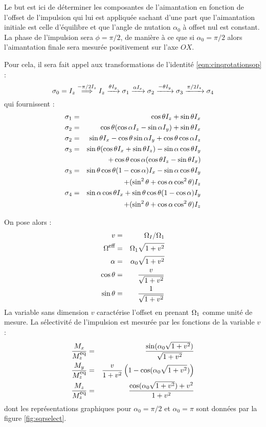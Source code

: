 Le but est ici de déterminer les composantes de l'aimantation
en fonction de l'offset de l'impulsion qui lui est appliquée
sachant d'une part que l'aimantation initiale est celle d'équilibre
et que l'angle de nutation $\alpha_0$ à offset nul est constant.
La phase de l'impulsion sera $\phi = \pi/2$, de manière à ce que si $\alpha_0 = \pi/2$
alors l'aimantation finale sera mesurée positivement sur l'axe $OX$.

Pour cela, il sera fait appel aux transformations de 
l'identité \ref{eqn:cinqrotationsop} :
\begin{equation}
\sigma_0 = I_z
\stackrel{-\pi/2 I_z}{\Longrightarrow} I_z
\xrightarrow{\theta I_y} \sigma_1
\xrightarrow{\alpha I_x} \sigma_2
\xrightarrow{-\theta I_y} \sigma_3
\xrightarrow{\pi/2 I_z} \sigma_4
\end{equation}
qui fournissent :
\begin{eqnarray}
\sigma_1 & = & \cos\theta I_z + \sin\theta I_x \\
\sigma_2 & = & \cos\theta(\cos\alpha I_z - \sin\alpha I_y) + \sin\theta I_x \\
\sigma_2 & = & \sin\theta I_x - \cos\theta\sin\alpha I_y + \cos\theta\cos\alpha I_z \\
\sigma_3 & = & \sin\theta(\cos\theta I_x + \sin\theta I_z) - \sin\alpha\cos\theta I_y \nonumber\\
& & \quad + \cos\theta\cos\alpha(\cos\theta I_z - \sin\theta I_x) \\
\sigma_3 & = & \sin\theta\cos\theta(1 - \cos\alpha) I_x - \sin\alpha\cos\theta I_y \nonumber\\
& & \quad +(\sin^2\theta + \cos\alpha\cos^2\theta)I_z \\
\sigma_4 & = & \sin\alpha\cos\theta I_x + \sin\theta\cos\theta(1 - \cos\alpha) I_y \nonumber\\
& & \quad +(\sin^2\theta + \cos\alpha\cos^2\theta)I_z
\end{eqnarray}

On pose alors :
\begin{eqnarray}
v & = & \Omega_I / \Omega_1 \\
\Omega^{\mbox{\footnotesize{eff}}} & = & \Omega_1 \sqrt{1 + v^2} \\
\alpha & = & \alpha_0 \sqrt{1 + v^2} \\
\cos\theta & = & \frac{v}{\sqrt{1+v^2}} \\
\sin\theta & = & \frac{1}{\sqrt{1+v^2}}
\end{eqnarray}
La variable sans dimension $v$ caractérise l'offset en prenant $\Omega_1$
comme unité de mesure.
La sélectivité de l'impulsion est mesurée par les fonctions de la variable $v$ :
\begin{eqnarray}
\frac{M_x}{M^{\mbox{\footnotesize{eq}}}_z} & = &
\frac{\sin(\alpha_0\sqrt{1+v^2})}{\sqrt{1+v^2}} \\
\frac{M_y}{M^{\mbox{\footnotesize{eq}}}_z} & = &
\frac{v}{1+v^2} \left( 1 - \cos(\alpha_0\sqrt{1+v^2})\right)\\
\frac{M_z}{M^{\mbox{\footnotesize{eq}}}_z} & = &
\frac{\cos(\alpha_0\sqrt{1+v^2}) + v^2}{1+v^2}
\end{eqnarray}
dont les représentations graphiques pour $\alpha_0 = \pi/2$ et 
$\alpha_0 = \pi$ sont données par la figure \ref{fig:sqrselect}.

